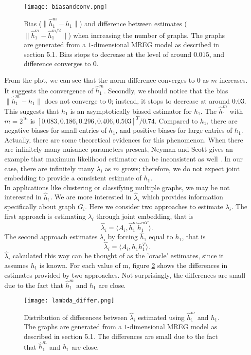 \documentclass[10pt,journal,compsoc]{IEEEtran}
\begin{document}
\begin{figure}[!htbp]
	\centering
	\texttt{[image: biasandconv.png]}
	\caption{Bias ($\|\hat{h}^m_1-h_1\|$) and difference between estimates ($\|\hat{h}_1^m-\hat{h}_1^{m/2}\|$) when increasing the number of graphs. The graphs are generated from a $1$-dimensional MREG model as described in section 5.1. Bias stops to decrease at the level of around $0.015$, and difference converges to $0$. }
	\label{fig:db}
\end{figure}

\noindent From the plot, we can see that the norm difference converges to $0$ as $m$ increases. It suggests the convergence of $\hat{h}_1^m$. Secondly, we should notice that the bias $\|\hat{h}^m_1-h_1\|$ does not converge to $0$; instead, it stops to decrease at around $0.03$. This suggests that $\hat{h}_1$ is an asymptotically biased estimator for $h_1$. The $\hat{h}_1^m$ with $m=2^{16}$ is $[0.083,0.186, 0.296, 0.406, 0.503]^T/0.74$. Compared to $h_1$, there are negative biases for small entries of $h_1$, and positive biases for large entries of $h_1$. Actually, there are some theoretical evidences for this phenomenon. When there are infinitely many nuisance parameters present, Neyman and Scott gives an example that maximum likelihood estimator can be inconsistent as well \cite{neyman1948consistent}. In our case, there are infinitely many $\lambda_i$ as $m$ grows; therefore, we do not expect joint embedding to provide a consistent estimate of $h_1$. \\

\noindent In applications like clustering or classifying multiple graphs, we may be not interested in $\hat{h}_1$. We are more interested in $\hat{\lambda}_i$ which provides information specifically about graph $G_i$. Here we consider two approaches to estimate $\lambda_i$. The first approach is estimating $\lambda_i$ through joint embedding, that is
\[ \hat{\lambda}_i = \langle A_i,  \hat{h}^m_1 \hat{h}^{m T}_1 \rangle. \]
The second approach estimates $\lambda_i$ by forcing $\hat{h}_1$ equal to $h_1$, that is 
\[ \hat{\lambda}_i = \langle A_i,  h_1 h_1^T \rangle. \]
$\hat{\lambda}_i$ calculated this way can be thought of as the 'oracle' estimates, since it assumes $h_1$ is known. For each value of m, figure \ref{fig:ld} shows the differences in estimates provided by two approaches. Not surprisingly, the differences are small due to the fact that $\hat{h}_1^m$ and $h_1$ are close.
\begin{figure}[!htbp]
	\centering
	\texttt{[image: lambda\_differ.png]}
	\caption{Distribution of differences between $\hat{\lambda}_i$ estimated using $\hat{h}_1^m$ and $h_1$. The graphs are generated from a $1$-dimensional MREG model as described in section 5.1. The differences are small due to the fact that $\hat{h}_1^m$ and $h_1$ are close.}
	\label{fig:ld}
\end{figure}
\end{document}
